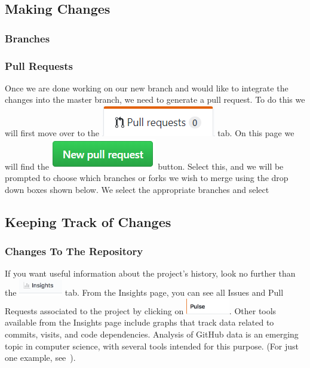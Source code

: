 \documentclass[11pt]{article}
\begin{document}
\subsection{Making Changes}

\hypertarget{branch-section}{\subsubsection{Branches}}


\subsubsection{Pull Requests}
Once we are done working on our new branch and would like to integrate the changes into the master branch, we need to generate a pull request. To do this we will first move over to the \includegraphics[scale=.75]{PullReqTab.png} tab. On this page we will find the \includegraphics[scale=.75]{NewPullReq.png} button. Select this, and we will be prompted to choose which branches or forks we wish to merge using the drop down boxes shown below. We select the appropriate branches and select 
\subsection{Keeping Track of Changes}

\subsubsection{Changes To The Repository} 

If you want useful information about the project's history, look no further than the \includegraphics[width=0.75in]{Insights} tab. From the Insights page, you can see all Issues and Pull Requests associated to the project by clicking on  \includegraphics[width=0.75in]{Pulse}. Other tools available from the Insights page include graphs that track data related to commits, visits, and code dependencies. Analysis of GitHub data is an emerging topic in computer science, with several tools intended for this purpose. (For just one example, see~\cite{github-gender-study}). 
\end{document}
